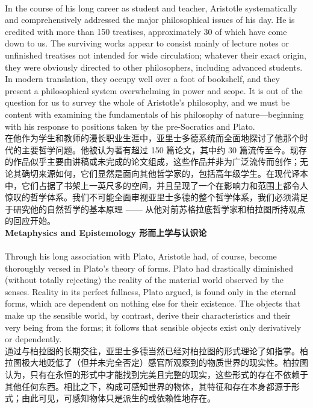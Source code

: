 \documentclass{article}
\begin{document}
\\
In the course of his long career as student and teacher, Aristotle systematically and comprehensively addressed the major philosophical issues of his day. He is credited with more than 150 treatises, approximately 30 of which have come down to us. The surviving works appear to consist mainly of lecture notes or unfinished treatises not intended for wide circulation; whatever their exact origin, they were obviously directed to other philosophers, including advanced students. In modern translation, they occupy well over a foot of bookshelf, and they present a philosophical system overwhelming in power and scope. It is out of the question for us to survey the whole of Aristotle’s philosophy, and we must be content with examining the fundamentals of his philosophy of nature—beginning with his response to positions taken by the pre-Socratics and Plato.\\
在他作为学生和教师的漫长职业生涯中，亚里士多德系统而全面地探讨了他那个时代的主要哲学问题。他被认为著有超过 150 篇论文，其中约 30 篇流传至今。现存的作品似乎主要由讲稿或未完成的论文组成，这些作品并非为广泛流传而创作；无论其确切来源如何，它们显然是面向其他哲学家的，包括高年级学生。在现代译本中，它们占据了书架上一英尺多的空间，并且呈现了一个在影响力和范围上都令人惊叹的哲学体系。我们不可能全面审视亚里士多德的整个哲学体系，我们必须满足于研究他的自然哲学的基本原理 —— 从他对前苏格拉底哲学家和柏拉图所持观点的回应开始。\\

\noindent\textbf{Metaphysics and Epistemology 形而上学与认识论}\\
\\
Through his long association with Plato, Aristotle had, of course, become thoroughly versed in Plato’s theory of forms. Plato had drastically diminished (without totally rejecting) the reality of the material world observed by the senses. Reality in its perfect fullness, Plato argued, is found only in the eternal forms, which are dependent on nothing else for their existence. The objects that make up the sensible world, by contrast, derive their characteristics and their very being from the forms; it follows that sensible objects exist only derivatively or dependently.\\
通过与柏拉图的长期交往，亚里士多德当然已经对柏拉图的形式理论了如指掌。柏拉图极大地贬低了（但并未完全否定）感官所观察到的物质世界的现实性。柏拉图认为，只有在永恒的形式中才能找到完美且完整的现实，这些形式的存在不依赖于其他任何东西。相比之下，构成可感知世界的物体，其特征和存在本身都源于形式；由此可见，可感知物体只是派生的或依赖性地存在。\\
\end{document}
